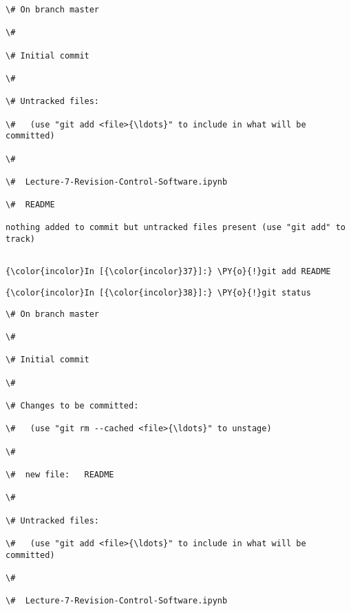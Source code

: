     \begin{Verbatim}[commandchars=\\\{\}]
\# On branch master

\#

\# Initial commit

\#

\# Untracked files:

\#   (use "git add <file>{\ldots}" to include in what will be committed)

\#

\#	Lecture-7-Revision-Control-Software.ipynb

\#	README

nothing added to commit but untracked files present (use "git add" to track)


    \end{Verbatim}



    \begin{Verbatim}[commandchars=\\\{\}]
{\color{incolor}In [{\color{incolor}37}]:} \PY{o}{!}git add README
\end{Verbatim}

    \begin{Verbatim}[commandchars=\\\{\}]
{\color{incolor}In [{\color{incolor}38}]:} \PY{o}{!}git status
\end{Verbatim}

    \begin{Verbatim}[commandchars=\\\{\}]
\# On branch master

\#

\# Initial commit

\#

\# Changes to be committed:

\#   (use "git rm --cached <file>{\ldots}" to unstage)

\#

\#	new file:   README

\#

\# Untracked files:

\#   (use "git add <file>{\ldots}" to include in what will be committed)

\#

\#	Lecture-7-Revision-Control-Software.ipynb


    \end{Verbatim}



